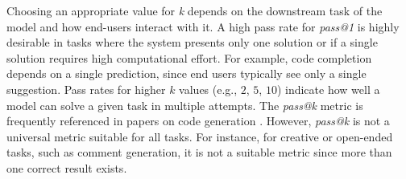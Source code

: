 Choosing an appropriate value for \emph{k} depends on the downstream task of the model and how end-users interact with it.
A high pass rate for \emph{pass@1} is highly desirable in tasks where the system presents only one solution or if a single solution requires high computational effort.
For example, code completion depends on a single prediction, since end users typically see only a single suggestion.
Pass rates for higher $k$ values (e.g., $2$, $5$, $10$) indicate how well a model can solve a given task in multiple attempts.
The \emph{pass@k} metric is frequently referenced in papers on code generation \cite{DBLP:journals/corr/abs-2308-12950, DBLP:journals/corr/abs-2401-14196, DBLP:journals/corr/abs-2409-12186, DBLP:journals/corr/abs-2305-06161}.
However, \emph{pass@k} is not a universal metric suitable for all tasks.
For instance, for creative or open-ended tasks, such as comment generation, it is not a suitable metric since more than one correct result exists.



